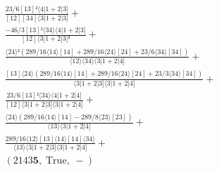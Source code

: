 \documentclass[varwidth, border=5pt]{standalone}
\begin{document}
\begin{my}
$\begin{gathered}
\scriptscriptstyle\frac{23/6[13]²⟨4|1+2|3]}{[12][34]⟨3|1+2|3]} +\\
\scriptscriptstyle\frac{-46/3[13]²⟨34⟩⟨4|1+2|3]}{[12]⟨3|1+2|3]²} +\\
\scriptscriptstyle\frac{⟨24⟩²(289/16⟨14⟩[14]+289/16⟨24⟩[24]+23/6⟨34⟩[34])}{⟨12⟩⟨34⟩⟨3|1+2|4]} +\\
\scriptscriptstyle\frac{[13]⟨24⟩(289/16⟨14⟩[14]+289/16⟨24⟩[24]+23/3⟨34⟩[34])}{⟨3|1+2|3]⟨3|1+2|4]} +\\
\scriptscriptstyle\frac{23/6[13]²⟨34⟩⟨4|1+2|4]}{[12]⟨3|1+2|3]⟨3|1+2|4]} +\\
\scriptscriptstyle\frac{⟨24⟩(289/16⟨14⟩[14]-289/8⟨23⟩[23])}{⟨13⟩⟨3|1+2|4]} +\\
\scriptscriptstyle\frac{289/16⟨12⟩[13]⟨14⟩[14]⟨34⟩}{⟨13⟩⟨3|1+2|3]⟨3|1+2|4]} +\\
\scriptscriptstyle(2143𝟓,\;\text{True},\;-) \phantom{+}
\end{gathered}$
\end{my}
\end{document}
